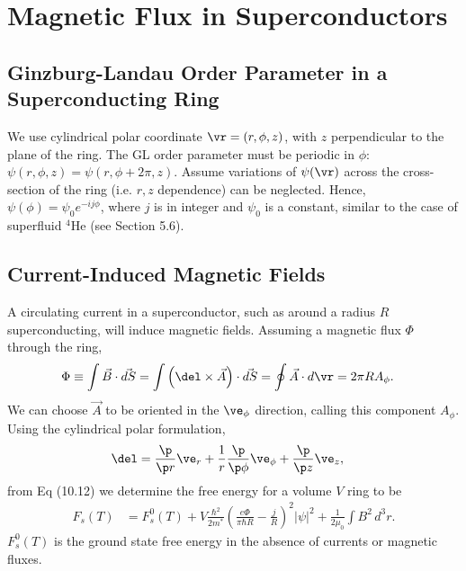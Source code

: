 \documentclass[a4paper, 11pt, normalem]{report}
\begin{document}
\chapter{Magnetic Flux in Superconductors}
\section{Ginzburg-Landau Order Parameter in a Superconducting Ring}
We use cylindrical polar coordinate $\vr=(r,\phi,z)$, with $z$ perpendicular to the plane of the ring.
The GL order parameter must be periodic in $\phi$: $\psi(r,\phi,z)=\psi(r,\phi+2\pi,z)$.
Assume variations of $\psi(\vr)$ across the cross-section of the ring (i.e. $r,z$ dependence) can be neglected.
Hence, $\psi(\phi)=\psi_0e^{-ij\phi}$, where $j$ is in integer and $\psi_0$ is a constant, similar to the case of superfluid ${}^4$He (see Section 5.6).

\section{Current-Induced Magnetic Fields}
A circulating current in a superconductor, such as around a radius $R$ superconducting, will induce magnetic fields.
Assuming a magnetic flux $\Phi$ through the ring,
\begin{align}
    \Phi &\equiv \int \vec{B}\cdot\vec{dS} = \int \left(\del\times\vec{A}\right)\cdot\vec{dS} = \oint \vec{A}\cdot d\vr = 2\pi RA_\phi.
\end{align}
We can choose $\vec{A}$ to be oriented in the $\ve_\phi$ direction, calling this component $A_\phi$.
Using the cylindrical polar formulation,
\begin{align}
    \del &= \frac{\p}{\p r}\ve_r + \frac{1}{r}\frac{\p}{\p\phi}\ve_\phi + \frac{\p}{\p z}\ve_z,
\end{align}
from Eq (10.12) we determine the free energy for a volume $V$ ring to be
\begin{align}
    F_s(T) &= F_s^0(T) + V\frac{\hbar^2}{2m^*}\left(\frac{e\Phi}{\pi\hbar R}-\frac{j}{R}\right)^2|\psi|^2 + \frac{1}{2\mu_0}\int B^2\,d^3r.
\end{align}
$F_s^0(T)$ is the ground state free energy in the absence of currents or magnetic fluxes.
\end{document}
